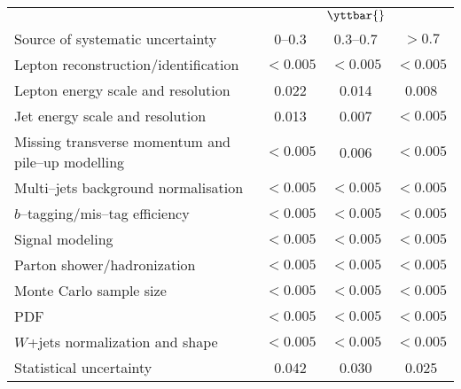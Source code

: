 \begin{table}[!htbp]\centering
\begin{tabular}{l c c c}
\toprule
 & \multicolumn{3}{c}{$\yttbar{}$}    \\
Source of systematic uncertainty           &    $0$--$0.3$          &        $0.3$--$0.7$     &  $>0.7$   \\
\midrule
Lepton reconstruction/identification              & $<0.005$ & $<0.005$ & $<0.005$ \\
Lepton energy scale and resolution                & 0.022 & 0.014 & 0.008   \\
Jet energy scale and resolution                   & 0.013 & 0.007 & $<0.005$   \\
Missing transverse momentum and pile--up modelling & $<0.005$ & 0.006 & $<0.005$ \\
Multi--jets background normalisation    & $<0.005$ & $<0.005$ & $<0.005$  \\
$b$--tagging/mis--tag efficiency                & $<0.005$ & $<0.005$ & $<0.005$  \\
Signal modeling                        & $<0.005$ & $<0.005$ & $<0.005$  \\
Parton shower/hadronization             & $<0.005$ & $<0.005$ & $<0.005$  \\
Monte Carlo sample size                 & $<0.005$ & $<0.005$ & $<0.005$  \\
PDF                                     & $<0.005$ & $<0.005$ & $<0.005$  \\
$W$+jets normalization and shape        & $<0.005$ & $<0.005$ & $<0.005$  \\
\midrule
Statistical uncertainty                 & 0.042                &        0.030      &        0.025     \\
\bottomrule
\end{tabular}
\caption{}
\label{table:Systematics_ytt}
\end{table}

